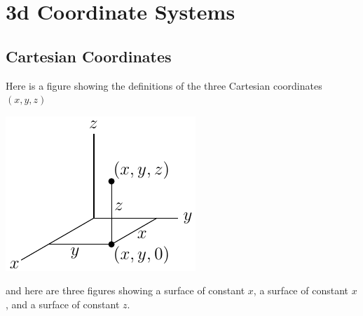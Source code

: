 \graphicspath{{figs_coord/}}

\renewcommand{\theequation}{\thechapter.\arabic{equation}}
\renewcommand{\thetheorem}{\thechapter.\arabic{theorem}}
\renewcommand{\thebc}{\thechapter.\arabic{theorem}}
\renewcommand{\theeg}{\thechapter.\arabic{theorem}}


\chapter{3d Coordinate Systems}\label{ap:3dcoord}

\section{Cartesian Coordinates}\label{ap:cartCoord}
Here is a figure showing the definitions of the 
three Cartesian coordinates $(x,y,z)$
\begin{efig}
\begin{center}
    \includegraphics{cart1.pdf}
\end{center}
\end{efig}
and here are three figures showing a surface of constant $x$,
a surface of constant $x$, and a surface of constant $z$.
